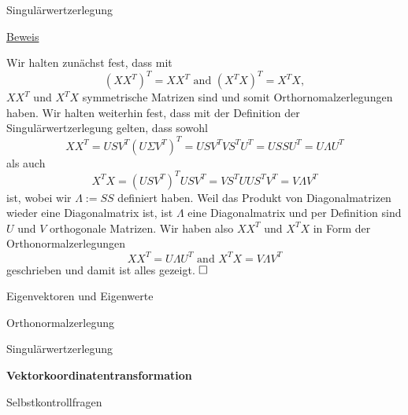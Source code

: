 \documentclass[
  8pt,
  ignorenonframetext,
]{beamer}
\begin{document}
\begin{frame}{Singulärwertzerlegung}
\protect\hypertarget{singuluxe4rwertzerlegung-2}{}
\footnotesize

\underline{Beweis} \vspace{1mm}

Wir halten zunächst fest, dass mit \begin{equation}
\left(XX^T\right)^T = XX^T \mbox{ and } \left(X^TX\right)^T = X^TX,
\end{equation} \(XX^T\) und \(X^TX\) symmetrische Matrizen sind und
somit Orthornomalzerlegungen haben. Wir halten weiterhin fest, dass mit
der Definition der Singulärwertzerlegung gelten, dass sowohl
\begin{equation}
XX^T
= USV^T \left(U\Sigma V^T\right)^T
= USV^T V S^T U^T
= USSU^T
= U\Lambda U^T
\end{equation} als auch \begin{equation}
X^TX
= \left(USV^T\right)^T USV^T
= VS^T UUS^T V^T
= V\Lambda V^T
\end{equation} ist, wobei wir \(\Lambda := SS\) definiert haben. Weil
das Produkt von Diagonalmatrizen wieder eine Diagonalmatrix ist, ist
\(\Lambda\) eine Diagonalmatrix und per Definition sind \(U\) und \(V\)
orthogonale Matrizen. Wir haben also \(XX^T\) und \(X^TX\) in Form der
Orthonormalzerlegungen \begin{equation}
XX^T = U \Lambda U^T  \mbox{ and } X^TX = V \Lambda V^T
\end{equation} geschrieben und damit ist alles gezeigt. \(\hfill \Box\)
\end{frame}

\begin{frame}{}
\protect\hypertarget{section-6}{}
\vfill
{}
\Large

Eigenvektoren und Eigenwerte

Orthonormalzerlegung

Singulärwertzerlegung

\textbf{Vektorkoordinatentransformation}

Selbstkontrollfragen \vfill 
\end{frame}
\end{document}
